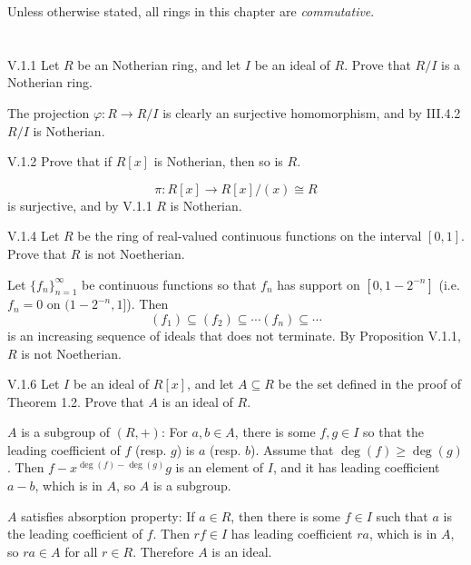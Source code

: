 Unless otherwise stated, all rings in this chapter are \emph{commutative}.

\section{}


\begin{problem}{V.1.1}
Let $R$ be an Notherian ring, and let $I$ be an ideal of $R$. Prove that $R/I$ is a Notherian ring.
\end{problem}
\begin{pf}
The projection $\varphi: R \to R/I$ is clearly an surjective homomorphism, and by III.4.2 $R/I$ is Notherian.
\end{pf}

\begin{problem}{V.1.2}
Prove that if $R[x]$ is Notherian, then so is $R$.
\end{problem}
\begin{pf}
\[
\pi: R[x] \to R[x]/(x) \cong R
\]
is surjective, and by V.1.1 $R$ is Notherian.
\end{pf}

\begin{problem}{V.1.4}
Let $R$ be the ring of real-valued continuous functions on the interval $[0,1]$. Prove that $R$ is not Noetherian.
\end{problem}
\begin{pf}
Let $\{f_n\}_{n = 1}^\infty$ be continuous functions so that $f_n$ has support on $[0,1-2^{-n}]$ (i.e. $f_n = 0$ on $(1-2^{-n},1]$). Then  
\[
(f_1) \subseteq (f_2) \subseteq \cdots (f_n) \subseteq \cdots	
\] 
is an increasing sequence of ideals that does not terminate. By Proposition V.1.1, $R$ is not Noetherian.
\end{pf}

\begin{problem}{V.1.6}
Let $I$ be an ideal of $R[x]$, and let $A \subseteq R$ be the set defined in the proof of Theorem 1.2. Prove that $A$ is an ideal of $R$.
\end{problem}
\begin{pf}
$A$ is a subgroup of $(R,+)$: For $a, b \in A$, there is some $f, g \in I$ so that the leading coefficient of $f$ (resp. $g$) is $a$ (resp. $b$). Assume that $\deg(f) \geq \deg(g)$. Then $f - x^{\deg(f)-\deg(g)}g$ is an element of $I$, and it has leading coefficient $a-b$, which is in $A$, so $A$ is a subgroup.

$A$ satisfies absorption property: If $a \in R$, then there is some $f \in I$ such that $a$ is the leading coefficient of $f$. Then $rf \in I$ has leading coefficient $ra$, which is in $A$, so $ra \in A$ for all $r \in R$. Therefore $A$ is an ideal.   
\end{pf}


